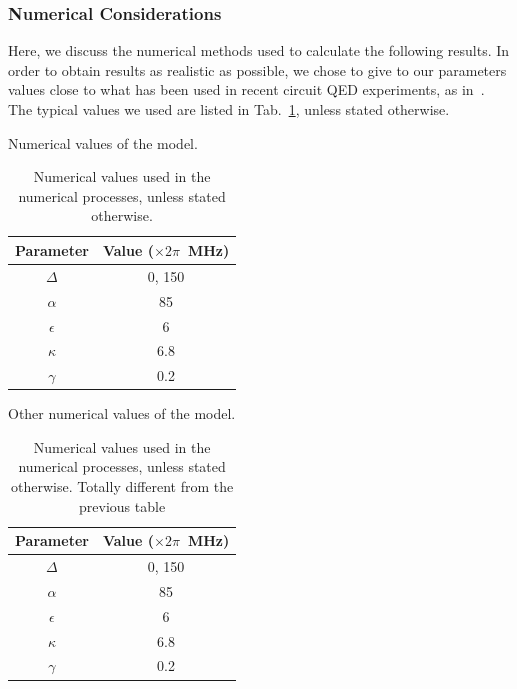 \subsubsection{Numerical Considerations}

Here, we discuss the numerical methods used to calculate the following results. In order to obtain results as realistic as possible, we chose to give to our parameters values close to what has been used in recent circuit QED experiments, as in~\cite{Fin09}. The typical values we used are listed in Tab.~\ref{tab-values}, unless stated otherwise.

\begin{table} \begin{center}
        \caption{Numerical values of the model. }
        \begin{tabular}{c|c}
            Parameter    & Value ($\times 2 \pi$~MHz) \\ \hline \hline
            $\Delta$     & 0, 150                     \\
            ${\alpha}$   & 85                         \\
            ${\epsilon}$ & 6                          \\
            ${\kappa}$   & 6.8                        \\
            ${\gamma}$   & 0.2
        \end{tabular}
        \label{tab-values}
        \caption*{Numerical values used in the numerical processes, unless stated otherwise. }
    \end{center}\end{table}


\begin{table} \begin{center}
        \caption{Other numerical values of the model. }
        \begin{tabular}{c|c}
            Parameter    & Value ($\times 2 \pi$~MHz) \\ \hline \hline
            $\Delta$     & 0, 150                     \\
            ${\alpha}$   & 85                         \\
            ${\epsilon}$ & 6                          \\
            ${\kappa}$   & 6.8                        \\
            ${\gamma}$   & 0.2
        \end{tabular}
        \label{tab-values2}
        \caption*{Numerical values used in the numerical processes, unless stated otherwise. Totally different from the previous table}
    \end{center}\end{table}

